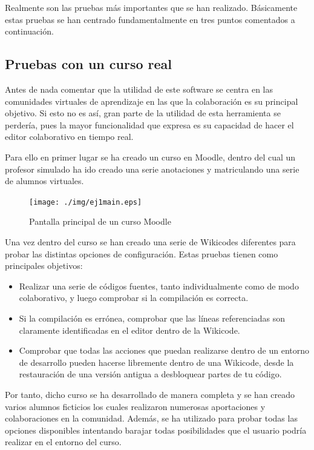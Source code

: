 Realmente son las pruebas más importantes que se han realizado. Básicamente estas pruebas se han centrado fundamentalmente en tres puntos comentados a continuación.

\subsection{Pruebas con un curso real}	
	
Antes de nada comentar que la utilidad de este software se centra en las comunidades virtuales de aprendizaje en las que la colaboración es su principal objetivo. Si esto no es así, gran parte de la utilidad de esta herramienta se perdería, pues la mayor funcionalidad que expresa es su capacidad de hacer el editor colaborativo en tiempo real. 

Para ello en primer lugar se ha creado un curso en Moodle, dentro del cual un profesor simulado ha ido creado una serie anotaciones y matriculando una serie de alumnos virtuales.

\begin{figure}[h]
	\texttt{[image: ./img/ej1main.eps]}
	\caption{Pantalla principal de un curso Moodle}
\end{figure}
	
Una vez dentro del curso se han creado una serie de Wikicodes diferentes para probar las distintas opciones de configuración. Estas pruebas tienen como principales objetivos:

\begin{itemize}
	\item Realizar una serie de códigos fuentes, tanto individualmente como de modo colaborativo, y luego comprobar si la compilación es correcta.
	\item Si la compilación es errónea, comprobar que las líneas referenciadas son claramente identificadas en el editor dentro de la Wikicode.
	\item Comprobar que todas las acciones que puedan realizarse dentro de un entorno de desarrollo pueden hacerse libremente dentro de una Wikicode, desde la restauración de una versión antigua a desbloquear partes de tu código.
\end{itemize}

Por tanto, dicho curso se ha desarrollado de manera completa y se han creado varios alumnos ficticios los cuales realizaron numerosas aportaciones y colaboraciones en la comunidad. Además, se ha utilizado para probar todas las opciones disponibles intentando barajar todas posibilidades que el usuario podría realizar en el entorno del curso.

